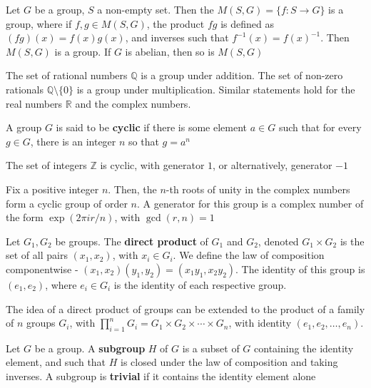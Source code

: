 \begin{exmp}
    Let $G$ be a group, $S$ a non-empty set. Then the $M(S, G) = \{ f: S \to G  \}$ is a group, where if $f, g \in M(S, G)$, the product $fg$ is defined as $(fg)(x) = f(x)g(x)$,
    and inverses such that $f^{-1}(x) = f(x) ^{-1}$. Then $M(S, G)$ is a group. If $G$ is abelian, then so is $M(S, G)$
 \end{exmp}

 \begin{exmp}
    The set of rational numbers $\mathbb{Q}$ is a group under addition. The set of non-zero rationals $\mathbb{Q} \setminus \{0\}$ is a group under multiplication. Similar statements 
    hold for the real numbers $\mathbb{R}$ and the complex numbers.  
 \end{exmp}

 \begin{definition}
    A group $G$ is said to be \textbf{cyclic} if there is some element $a \in G$ such that for every $g \in G$, there is an integer $n$ so that $g = a^n$
 \end{definition}

 \begin{exmp}
    The set of integers $\mathbb{Z}$ is cyclic, with generator $1$, or alternatively, generator $-1$
 \end{exmp}

 \begin{exmp}
    Fix a positive integer $n$. Then, the $n$-th roots of unity in the complex numbers form a cyclic group of order $n$. A generator for this group is a complex number of 
    the form $\exp(2\pi ir/n)$, with $\gcd(r, n) = 1$
 \end{exmp}

 \begin{definition}
    Let $G_1, G_2$ be groups. The \textbf{direct product} of $G_1$ and $G_2$, denoted $G_1 \times G_2$ is the set of all pairs $(x_1, x_2)$, with $x_i \in G_i$. We define the law 
    of composition componentwise - $(x_1, x_2)(y_1, y_2) = (x_1y_1, x_2y_2)$. The identity of this group is $(e_1, e_2)$, where $e_i \in G_i$ is the identity of each respective group. 
 \end{definition}

 The idea of a direct product of groups can be extended to the product of a family of $n$ groups $G_i$, with $\prod_{i=1}^n G_i = G_1 \times G_2 \times \cdots \times G_n$, with 
 identity $(e_1, e_2, \ldots, e_n)$.

 \begin{definition}
    Let $G$ be a group. A \textbf{subgroup} $H$ of $G$ is a subset of $G$ containing the identity element, and such that $H$ is closed under the law of composition and taking inverses.
    A subgroup is \textbf{trivial} if it contains the identity element alone
 \end{definition}

